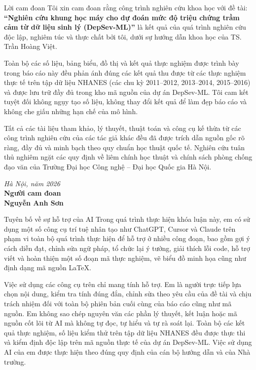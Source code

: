\documentclass{uetgraduation}
\begin{document}
\begin{preamble}{Lời cam đoan}
Tôi xin cam đoan rằng công trình nghiên cứu khoa học với đề tài: \textbf{“Nghiên cứu khung học máy cho dự đoán mức độ triệu chứng trầm cảm từ dữ liệu sinh lý (DepSev-ML)”} là kết quả của quá trình nghiên cứu độc lập, nghiêm túc và thực chất bởi tôi, dưới sự hướng dẫn khoa học của TS. Trần Hoàng Việt.

Toàn bộ các số liệu, bảng biểu, đồ thị và kết quả thực nghiệm được trình bày trong báo cáo này đều phản ánh đúng các kết quả thu được từ các thực nghiệm thực tế trên tập dữ liệu NHANES (các chu kỳ 2011--2012, 2013--2014, 2015--2016) và được lưu trữ đầy đủ trong kho mã nguồn của dự án DepSev-ML. Tôi cam kết tuyệt đối không ngụy tạo số liệu, không thay đổi kết quả để làm đẹp báo cáo và không che giấu những hạn chế của mô hình.

Tất cả các tài liệu tham khảo, lý thuyết, thuật toán và công cụ kế thừa từ các công trình nghiên cứu của các tác giả khác đều đã được trích dẫn nguồn gốc rõ ràng, đầy đủ và minh bạch theo quy chuẩn học thuật quốc tế. Nghiên cứu tuân thủ nghiêm ngặt các quy định về liêm chính học thuật và chính sách phòng chống đạo văn của Trường Đại học Công nghệ -- Đại học Quốc gia Hà Nội.

\vspace{1.5cm}
\begin{flushright}
\textit{Hà Nội, năm 2026}\\[0.2cm]
\textbf{Người cam đoan}\\[1.5cm]
\textbf{Nguyễn Anh Sơn}
\end{flushright}
\end{preamble}

\begin{preamble}{Tuyên bố về sự hỗ trợ của AI}
Trong quá trình thực hiện khóa luận này, em có sử dụng một số công cụ trí tuệ nhân tạo như ChatGPT, Cursor và Claude trên phạm vi toàn bộ quá trình thực hiện để hỗ trợ ở nhiều công đoạn, bao gồm gợi ý cách diễn đạt, chỉnh sửa ngữ pháp, tổ chức lại ý tưởng, giải thích lỗi code, hỗ trợ viết và hoàn thiện một số đoạn mã thực nghiệm, vẽ biểu đồ minh họa cũng như định dạng mã nguồn \LaTeX.

Việc sử dụng các công cụ trên chỉ mang tính hỗ trợ. Em là người trực tiếp lựa chọn nội dung, kiểm tra tính đúng đắn, chỉnh sửa theo yêu cầu của đề tài và chịu trách nhiệm đối với toàn bộ phiên bản cuối cùng của báo cáo cũng như mã nguồn. Em không sao chép nguyên văn các phần lý thuyết, kết luận hoặc mã nguồn cốt lõi từ AI mà không tự đọc, tự hiểu và tự rà soát lại. Toàn bộ các kết quả thực nghiệm, số liệu kiểm thử trên tập dữ liệu NHANES đều được thực thi và kiểm định độc lập trên mã nguồn thực tế của dự án DepSev-ML. Việc sử dụng AI của em được thực hiện theo đúng quy định của cán bộ hướng dẫn và của Nhà trường.
\end{preamble}
\end{document}

